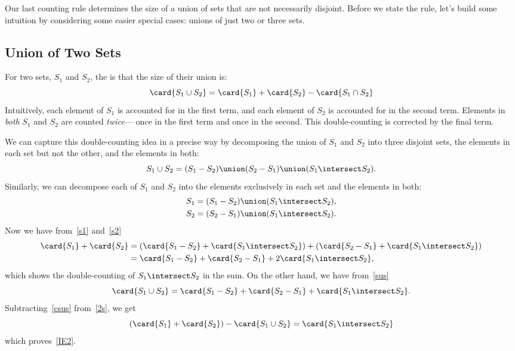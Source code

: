 Our last counting rule determines the size of a union of sets that are
not necessarily disjoint.  Before we state the rule, let's build some
intuition by considering some easier special cases: unions of just two
or three sets.

\subsection{Union of Two Sets}

For two sets, $S_1$ and $S_2$, the  is that the
size of their union is:
\begin{equation}\label{IE2}
\card{S_1 \cup S_2} = \card{S_1} + \card{S_2} - \card{S_1 \cap S_2}
\end{equation}
Intuitively, each element of $S_1$ is accounted for in the first term,
and each element of $S_2$ is accounted for in the second term.
Elements in \emph{both} $S_1$ and $S_2$ are counted
\emph{twice}--- once in the first term and once in the second.  This
double-counting is corrected by the final term.

We can capture this double-counting idea in a precise way by decomposing
the union of $S_1$ and $S_2$ into three disjoint sets, the elements in
each set but not the other, and the elements in both:
\begin{equation}\label{sus}
S_1 \cup S_2 = (S_1 - S_2) \union (S_2-S_1) \union (S_1 \intersect S_2).
\end{equation}
Similarly, we can decompose each of $S_1$ and $S_2$ into the elements
exclusively in each set and the elements in both:
\begin{align}
S_1 & = (S_1 - S_2) \union (S_1 \intersect S_2),\label{s1}\\
S_2 & = (S_2 - S_1) \union (S_1 \intersect S_2).\label{s2}
\end{align}
Now we have from~\eqref{s1} and~\eqref{s2}
\begin{align}
\card{S_1} + \card{S_2} & = (\card{S_1 - S_2} + \card{S_1 \intersect S_2})
                   + (\card{S_2 - S_1} + \card{S_1 \intersect S_2})\notag\\
        & = \card{S_1 - S_2} + \card{S_2 - S_1} +
                 2\card{S_1 \intersect S_2}, \label{2s}
\end{align}                      
which shows the double-counting of $S_1 \intersect S_2$ in the sum.  On
the other hand, we have from~\eqref{sus}
\begin{equation}\label{csus}
\card{S_1 \cup S_2} = \card{S_1 - S_2} + \card{S_2 - S_1}
                          + \card{S_1 \intersect S_2}.
\end{equation}
Subtracting~\eqref{csus} from~\eqref{2s}, we get
\[
(\card{S_1} + \card{S_2}) - \card{S_1 \cup S_2} =
          \card{S_1 \intersect S_2}
\]
which proves~\eqref{IE2}.

